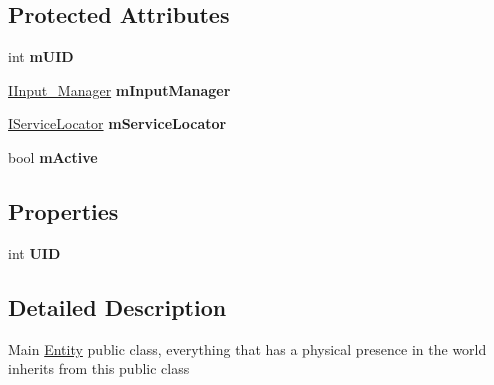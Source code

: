 \subsection*{Protected Attributes}
\begin{DoxyCompactItemize}
\item 
\mbox{\label{class_g_m_t_b_1_1_entities_1_1_entity_a6f13d14f6592db3fafeab8bc3428fbf0}} 
int {\bfseries m\+U\+ID}
\item 
\mbox{\label{class_g_m_t_b_1_1_entities_1_1_entity_a3f391408dbc4a562f920ea63008021b8}} 
\mbox{\hyperlink{interface_g_m_t_b_1_1_input_system_1_1_i_input___manager}{I\+Input\+\_\+\+Manager}} {\bfseries m\+Input\+Manager}
\item 
\mbox{\label{class_g_m_t_b_1_1_entities_1_1_entity_a56f05d5883150e76b1369e7c16e0e47e}} 
\mbox{\hyperlink{interface_g_m_t_b_1_1_interfaces_1_1_i_service_locator}{I\+Service\+Locator}} {\bfseries m\+Service\+Locator}
\item 
\mbox{\label{class_g_m_t_b_1_1_entities_1_1_entity_a18b80164984558c5b463abd6bf151bfe}} 
bool {\bfseries m\+Active}
\end{DoxyCompactItemize}
\subsection*{Properties}
\begin{DoxyCompactItemize}
\item 
\mbox{\label{class_g_m_t_b_1_1_entities_1_1_entity_a97f2859b9841495b499b77753edcea64}} 
int {\bfseries U\+ID}
\end{DoxyCompactItemize}


\subsection{Detailed Description}
Main \mbox{\hyperlink{class_g_m_t_b_1_1_entities_1_1_entity}{Entity}} public class, everything that has a physical presence in the world inherits from this public class 



